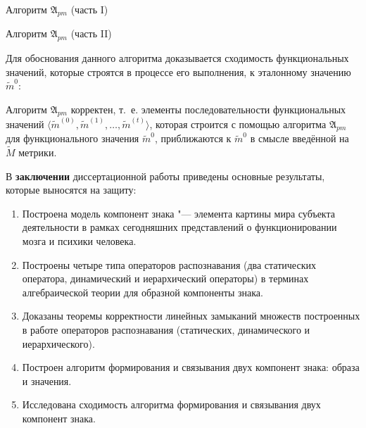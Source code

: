 \begin{algorithm}[h]
	\caption{Алгоритм $\mathfrak{A}_{pm}$ (часть I)}
	\label{alg:cycle_pm_start}
	\begin{algorithmic}[1]
		
	\end{algorithmic}
\end{algorithm}

\begin{algorithm}[h]
	\caption{Алгоритм $\mathfrak{A}_{pm}$ (часть II)}
	\label{alg:cycle_pm_end}
	\begin{algorithmic}[1]
		\algrestore{algst:store2}
		
	\end{algorithmic}
\end{algorithm}

Для обоснования данного алгоритма доказывается сходимость функциональных значений, которые строятся в процессе его выполнения, к эталонному значению $\tilde m^0$:

\begin{Theorem}
	Алгоритм $\mathfrak A_{pm}$ корректен, т.~е. элементы последовательности функциональных значений $\langle\tilde m^{(0)},\tilde m^{(1)},\dots,\tilde m^{(t)}\rangle$, которая строится с помощью алгоритма $\mathfrak A_{pm}$ для функционального значения $\tilde m^0$, приближаются к $\tilde m^0$ в смысле введённой на $\tilde M$ метрики.
\end{Theorem}

В \textbf{заключении} диссертационной работы приведены основные результаты, которые выносятся на защиту:
\begin{enumerate}
	\renewcommand\labelenumi{\theenumi.}
	\item Построена модель компонент знака "--- элемента картины мира субъекта деятельности в рамках сегодняшних представлений о функционировании мозга и психики человека.
	\item Построены четыре типа операторов распознавания (два статических оператора, динамический и иерархический операторы) в терминах алгебраической теории для образной компоненты знака.
	\item Доказаны теоремы корректности линейных замыканий множеств построенных в работе операторов распознавания (статических, динамического и иерархического).
	\item Построен алгоритм формирования и связывания двух компонент знака: образа и значения.
	\item Исследована сходимость алгоритма формирования и связывания двух компонент знака.
\end{enumerate}

\newpage
\renewcommand{\refname}{\Large Публикации автора по теме диссертации}
\titleformat{\subsection}[display]{}{}{}{\it}[]
\nocite{*}
